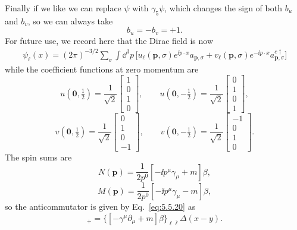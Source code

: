Finally if we like we can replace $\psi$ with $\gamma_5\psi$, which changes the
sign of both $b_u$ and $b_v$, so we can always take
\begin{equation}
b_u=-b_v=+1.
\tag{5.5.33}\label{eq:5.5.33}
\end{equation}
For future use, we record here that the Dirac field is now
\begin{align}
\psi_\ell(x)=(2\pi)^{-3/2}\sum_\sigma\int \dd^3p\,
\bigl[u_\ell(\mathbf p,\sigma)e^{\ii p\cdot x}a_{\mathbf p,\sigma}
+v_\ell(\mathbf p,\sigma)e^{-\ii p\cdot x}a^{c\dagger}_{\mathbf p,\sigma}\bigr]
\tag{5.5.34}\label{eq:5.5.34}
\end{align}
while the coefficient functions at zero momentum are
\begin{equation}
u(\mathbf0,\tfrac12)=\frac1{\sqrt2}\begin{bmatrix}1\\0\\1\\0\end{bmatrix},
\qquad
u(\mathbf0,-\tfrac12)=\frac1{\sqrt2}\begin{bmatrix}0\\1\\0\\1\end{bmatrix},
\tag{5.5.35}\label{eq:5.5.35}
\end{equation}
\begin{equation}
v(\mathbf0,\tfrac12)=\frac1{\sqrt2}\begin{bmatrix}0\\1\\0\\-1\end{bmatrix},
\qquad
v(\mathbf0,-\tfrac12)=\frac1{\sqrt2}\begin{bmatrix}-1\\0\\1\\0\end{bmatrix}.
\tag{5.5.36}\label{eq:5.5.36}
\end{equation}
The spin sums are
\begin{equation}
N(\mathbf p)=\frac1{2p^0}[-\ii p^\mu\gamma_\mu+m]\beta,
\tag{5.5.37}\label{eq:5.5.37}
\end{equation}
\begin{equation}
M(\mathbf p)=\frac1{2p^0}[-\ii p^\mu\gamma_\mu-m]\beta,
\tag{5.5.38}\label{eq:5.5.38}
\end{equation}
so the anticommutator is given by Eq.~\eqref{eq:5.5.20} as
\begin{equation}
[\psi_\ell(x),\psi_{\bar\ell}^\dagger(y)]_+
=\{[-\gamma^\mu\partial_\mu+m]\beta\}_{\ell\bar\ell}\Delta(x-y).
\tag{5.5.39}\label{eq:5.5.39}
\end{equation}

